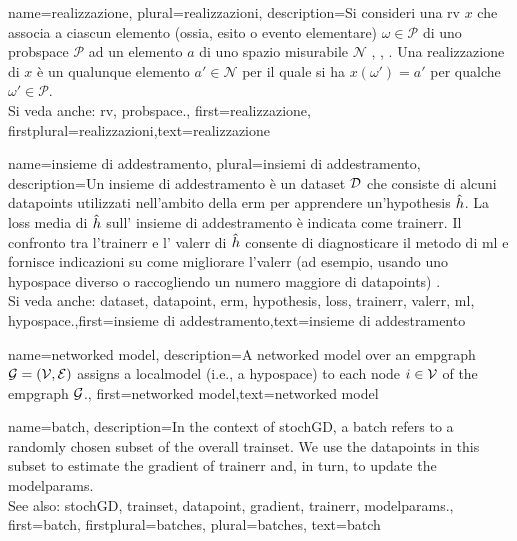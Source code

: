 	
{name={realizzazione}, plural={realizzazioni},
	description={Si consideri una \gls{rv} $x$ che associa a 
	ciascun elemento (ossia, esito o evento elementare) $\omega \in \mathcal{P}$ di uno \gls{probspace} $\mathcal{P}$ 
	ad un elemento $a$ di uno spazio misurabile $\mathcal{N}$ \cite{RudinBookPrinciplesMatheAnalysis}, \cite{HalmosMeasure}, \cite{BillingsleyProbMeasure}. 
	Una realizzazione di $x$ è un qualunque elemento $a' \in \mathcal{N}$ per il quale si ha 
	$x(\omega') = a'$ per qualche $\omega' \in \mathcal{P}$.
			\\
		Si veda anche: \gls{rv}, \gls{probspace}.}, first={realizzazione}, firstplural={realizzazioni},text={realizzazione}  }

{name={insieme di addestramento}, plural={insiemi di addestramento},
description={Un insieme di addestramento è un \gls{dataset} $\mathcal{D}$ che consiste di alcuni \glspl{datapoint} utilizzati nell'ambito della \gls{erm} 
	per apprendere un'\gls{hypothesis} $\hat{h}$. La \gls{loss} media di $\hat{h}$ sull' 
	insieme di addestramento è indicata come \gls{trainerr}. Il confronto tra l'\gls{trainerr} e l' 
	\gls{valerr} di $\hat{h}$ consente di diagnosticare il metodo di \gls{ml} e fornisce indicazioni su come migliorare  
	l'\gls{valerr} (ad esempio, usando uno \gls{hypospace} diverso o raccogliendo un numero maggiore di \glspl{datapoint}) \cite[Sec. 6.6]{MLBasics}.
			\\
		Si veda anche: \gls{dataset}, \gls{datapoint}, \gls{erm}, \gls{hypothesis}, \gls{loss}, \gls{trainerr}, \gls{valerr}, \gls{ml}, \gls{hypospace}.},first={insieme di addestramento},text={insieme di addestramento}  
}

{name={networked model},
  description={A networked \gls{model} over an \gls{empgraph} $\mathcal{G} = \left( \mathcal{V},\mathcal{E} \right)$ assigns 
   a \gls{localmodel} (i.e., a \gls{hypospace}) to each node $i \in \mathcal{V}$ of the \gls{empgraph} $\mathcal{G}$.}, 
   first={networked model},text={networked model}  
}

{name={batch},
 description={In the context of \gls{stochGD}, a batch refers to a randomly 
	chosen subset of the overall \gls{trainset}. We use the \glspl{datapoint} in this subset 
	to estimate the \gls{gradient} of \gls{trainerr} and, in turn, to update the \glspl{modelparam}.
			\\
		See also: \gls{stochGD}, \gls{trainset}, \gls{datapoint}, \gls{gradient}, \gls{trainerr}, \glspl{modelparam}.}, 
 first={batch},
 firstplural={batches}, 
 plural={batches}, 
 text={batch}  
}

